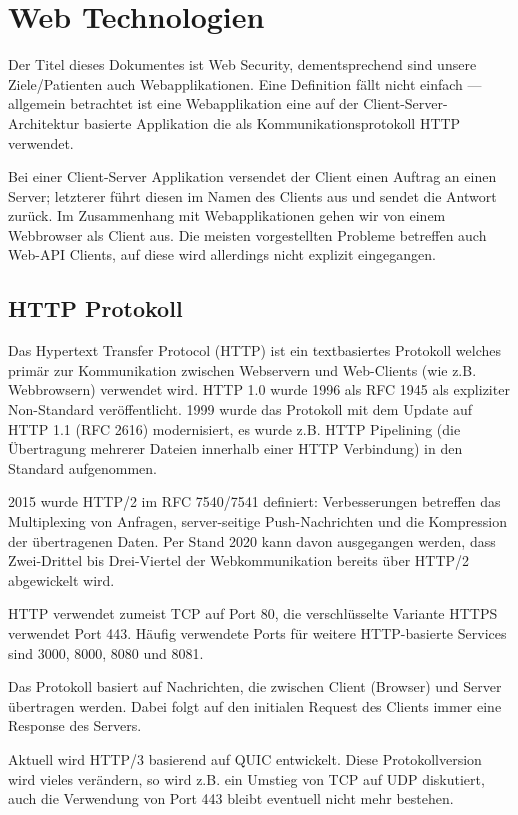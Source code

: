 \chapter{Web Technologien}

Der Titel dieses Dokumentes ist Web Security, dementsprechend sind unsere Ziele/Patienten auch Webapplikationen. Eine Definition fällt nicht einfach --- allgemein betrachtet ist eine Webapplikation eine auf der Client-Server-Architektur basierte Applikation die als Kommunikationsprotokoll HTTP verwendet.

Bei einer Client-Server Applikation versendet der Client einen Auftrag an einen Server; letzterer führt diesen im Namen des Clients aus und sendet die Antwort zurück. Im Zusammenhang mit Webapplikationen gehen wir von einem Webbrowser als Client aus. Die meisten vorgestellten Probleme betreffen auch Web-API Clients, auf diese wird allerdings nicht explizit eingegangen.

\section{HTTP Protokoll}

Das Hypertext Transfer Protocol (HTTP) ist ein textbasiertes Protokoll welches primär zur Kommunikation zwischen Webservern und Web-Clients (wie z.B. Webbrowsern) verwendet wird. HTTP 1.0 wurde 1996 als RFC 1945 als expliziter Non-Standard veröffentlicht. 1999 wurde das Protokoll mit dem Update auf HTTP 1.1 (RFC 2616) modernisiert, es wurde z.B. HTTP Pipelining (die Übertragung mehrerer Dateien innerhalb einer HTTP Verbindung) in den Standard aufgenommen.

2015 wurde HTTP/2 im RFC 7540/7541 definiert: Verbesserungen betreffen das Multiplexing von Anfragen, server-seitige Push-Nachrichten und die Kompression der übertragenen Daten. Per Stand 2020 kann davon ausgegangen werden, dass Zwei-Drittel bis Drei-Viertel der Webkommunikation bereits über HTTP/2 abgewickelt wird.

HTTP verwendet zumeist TCP auf Port 80, die verschlüsselte Variante HTTPS verwendet Port 443. Häufig verwendete Ports für weitere HTTP-basierte Services sind 3000, 8000, 8080 und 8081.

Das Protokoll basiert auf Nachrichten, die zwischen Client (Browser) und Server übertragen werden. Dabei folgt auf den initialen Request des Clients immer eine Response des Servers.

Aktuell wird HTTP/3 basierend auf QUIC entwickelt. Diese Protokollversion wird vieles verändern, so wird z.B. ein Umstieg von TCP auf UDP diskutiert, auch die Verwendung von Port 443 bleibt eventuell nicht mehr bestehen.

